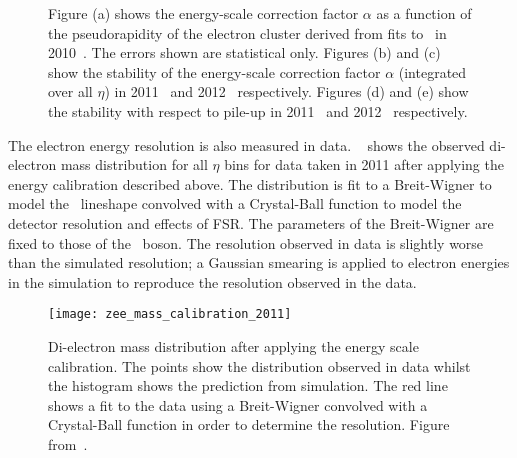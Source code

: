 \begin{figure}[h!]
\centering
        \hspace{10mm}
\caption[Electron energy-scale correction factor $\alpha$ derived from fits to
\Zee.]{
Figure (a) shows the energy-scale correction factor $\alpha$ as a function of the
pseudorapidity of the electron cluster derived from fits to \Zee\ in
2010~\cite{Aad:2011mk}. The errors shown are statistical only.
Figures (b) and (c) show the stability of the energy-scale correction factor
$\alpha$ (integrated over all $\eta$) in 2011~\cite{ElectronEnergyTimePileup2011} and 2012~\cite{ElectronEnergyTime2012} respectively. Figures (d)
and (e) show the stability with respect to pile-up in 2011~\cite{ElectronEnergyTimePileup2011} and
2012~\cite{ElectronEnergyPileup2012}
respectively.}
\label{fig:el-energy-calib-const}
\end{figure}

The electron energy resolution is also measured in data. ~ shows the observed di-electron 
mass distribution for all $\eta$ bins for data taken in 2011 after applying the
energy calibration described above. The distribution
is fit to a Breit-Wigner to model the \Z\ lineshape convolved with a
Crystal-Ball function to model the detector resolution and effects of FSR. The
parameters of the Breit-Wigner are fixed to those of the \Z\ boson. The
resolution observed in data is slightly worse than the simulated resolution; a
Gaussian smearing is applied to electron energies in the simulation to reproduce the resolution observed in the data.

\begin{figure}[h]
\centering
            \texttt{[image: zee\_mass\_calibration\_2011]}
\caption[Di-electron mass distribution after applying the
energy scale calibration.]{Di-electron mass distribution after applying the
energy scale calibration. The points show the distribution observed in data
whilst the histogram shows the prediction from simulation. The red line shows a
fit to the data 
using a Breit-Wigner convolved with a
Crystal-Ball function in order to determine the resolution. Figure from~\cite{ElectronZee2011}.}
\label{fig:el-energy-calib-2011}
\end{figure}

